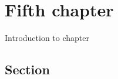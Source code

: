 \chapter{Fifth chapter}
\label{chap:fifth-chapter}
Introduction to chapter

\section{Section}
\label{sec:fifth-section}

\newpage
